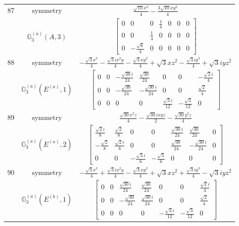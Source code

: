 \documentclass[fleqn,8pt,landscape]{jsarticle}
\begin{document}
\begin{longtable}{ccc}
$ 87 $ & $ \text{symmetry} $ & $ \frac{\sqrt{10} x^{3}}{4} - \frac{3 \sqrt{10} x y^{2}}{4} $ \\
$  $ & $ \mathbb{G}_{3}^{(a)}(A,3) $ & $ \begin{bmatrix} 0 & 0 & 0 & \frac{1}{4} & 0 & 0 & 0 \\ 0 & 0 & \frac{1}{4} & 0 & 0 & 0 & 0 \\ 0 & - \frac{\sqrt{6}}{4} & 0 & 0 & 0 & 0 & 0 \end{bmatrix} $ \\ \hline
$ 88 $ & $ \text{symmetry} $ & $ - \frac{\sqrt{3} x^{3}}{4} - \frac{\sqrt{3} i x^{2} y}{4} - \frac{\sqrt{3} x y^{2}}{4} + \sqrt{3} x z^{2} - \frac{\sqrt{3} i y^{3}}{4} + \sqrt{3} i y z^{2} $ \\
$  $ & $ \mathbb{G}_{3}^{(a)}(E^{(a)},1) $ & $ \begin{bmatrix} 0 & 0 & - \frac{\sqrt{30} i}{24} & \frac{\sqrt{30}}{24} & 0 & 0 & - \frac{\sqrt{2} i}{4} \\ 0 & 0 & - \frac{\sqrt{30}}{24} & - \frac{\sqrt{30} i}{24} & 0 & 0 & \frac{\sqrt{2}}{4} \\ 0 & 0 & 0 & 0 & \frac{\sqrt{3} i}{12} & - \frac{\sqrt{3}}{12} & 0 \end{bmatrix} $ \\ \hline
$ 89 $ & $ \text{symmetry} $ & $ \frac{\sqrt{30} x^{2} z}{4} - \frac{\sqrt{30} i x y z}{2} - \frac{\sqrt{30} y^{2} z}{4} $ \\
$  $ & $ \mathbb{G}_{3}^{(a)}(E^{(a)},2) $ & $ \begin{bmatrix} \frac{\sqrt{2} i}{8} & \frac{\sqrt{2}}{8} & 0 & 0 & \frac{\sqrt{30} i}{24} & \frac{\sqrt{30}}{24} & 0 \\ - \frac{\sqrt{2}}{8} & \frac{\sqrt{2} i}{8} & 0 & 0 & \frac{\sqrt{30}}{24} & - \frac{\sqrt{30} i}{24} & 0 \\ 0 & 0 & - \frac{\sqrt{3} i}{6} & - \frac{\sqrt{3}}{6} & 0 & 0 & 0 \end{bmatrix} $ \\ \hline
$ 90 $ & $ \text{symmetry} $ & $ - \frac{\sqrt{3} x^{3}}{4} + \frac{\sqrt{3} i x^{2} y}{4} - \frac{\sqrt{3} x y^{2}}{4} + \sqrt{3} x z^{2} + \frac{\sqrt{3} i y^{3}}{4} - \sqrt{3} i y z^{2} $ \\
$  $ & $ \mathbb{G}_{3}^{(a)}(E^{(b)},1) $ & $ \begin{bmatrix} 0 & 0 & \frac{\sqrt{30} i}{24} & \frac{\sqrt{30}}{24} & 0 & 0 & \frac{\sqrt{2} i}{4} \\ 0 & 0 & - \frac{\sqrt{30}}{24} & \frac{\sqrt{30} i}{24} & 0 & 0 & \frac{\sqrt{2}}{4} \\ 0 & 0 & 0 & 0 & - \frac{\sqrt{3} i}{12} & - \frac{\sqrt{3}}{12} & 0 \end{bmatrix} $ \\ \hline

\end{longtable}
\end{document}
